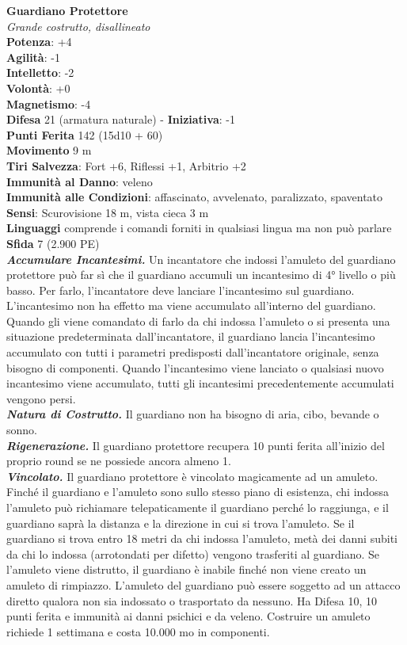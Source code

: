 \begin{multicols}{2}
\medskip\textbf{Guardiano Protettore}\\
\emph{Grande costrutto, disallineato}\\
\textbf{Potenza}: +4\\
\textbf{Agilità}: -1\\
\textbf{Intelletto}: -2\\
\textbf{Volontà}: +0\\
\textbf{Magnetismo}: -4\\
\textbf{Difesa} 21 (armatura naturale) - \textbf{Iniziativa}: -1\\
\textbf{Punti Ferita} 142 (15d10 + 60)\\
\textbf{Movimento} 9 m\\
\textbf{Tiri Salvezza}: Fort +6, Riflessi +1, Arbitrio +2\\
\textbf{Immunità al Danno}: veleno\\
\textbf{Immunità alle Condizioni}: affascinato, avvelenato, paralizzato, spaventato\\
\textbf{Sensi}: Scurovisione 18 m, vista cieca 3 m \\
\textbf{Linguaggi} comprende i comandi forniti in qualsiasi lingua ma non può parlare\\
\textbf{Sfida} 7 (2.900 PE)\smallskip\\
\emph{\textbf{Accumulare Incantesimi.}} Un incantatore che indossi l'amuleto del guardiano protettore può far sì che il guardiano accumuli un incantesimo di 4° livello o più basso. Per farlo, l'incantatore deve lanciare l'incantesimo sul guardiano. L'incantesimo non ha effetto ma viene accumulato all'interno del guardiano. Quando gli viene comandato di farlo da chi indossa l'amuleto o si presenta una situazione predeterminata dall'incantatore, il guardiano lancia l'incantesimo accumulato con tutti i parametri predisposti dall'incantatore originale, senza bisogno di componenti. Quando l'incantesimo viene lanciato o qualsiasi nuovo incantesimo viene accumulato, tutti gli incantesimi precedentemente accumulati vengono persi.\\
\emph{\textbf{Natura di Costrutto.}} Il guardiano non ha bisogno di aria, cibo, bevande o sonno.\\
\emph{\textbf{Rigenerazione.}} Il guardiano protettore recupera 10 punti  ferita all'inizio del proprio round se ne possiede ancora almeno 1.\\
\emph{\textbf{Vincolato.}} Il guardiano protettore è vincolato magicamente ad un amuleto. Finché il guardiano e l'amuleto sono sullo stesso piano di esistenza, chi indossa l'amuleto può richiamare telepaticamente il guardiano perché lo raggiunga, e il guardiano saprà la distanza e la direzione in cui si trova l'amuleto. Se il guardiano si trova entro 18 metri da chi indossa l'amuleto, metà dei danni subiti da chi lo indossa (arrotondati per difetto) vengono trasferiti al guardiano. Se l'amuleto viene distrutto, il guardiano è inabile finché non viene creato un amuleto di rimpiazzo. L'amuleto del guardiano può essere soggetto ad un attacco diretto qualora non sia indossato o trasportato da nessuno. Ha Difesa 10, 10 punti ferita e immunità ai danni psichici e da veleno. Costruire un amuleto richiede 1 settimana e costa 10.000 mo in componenti.\\

\end{multicols}

